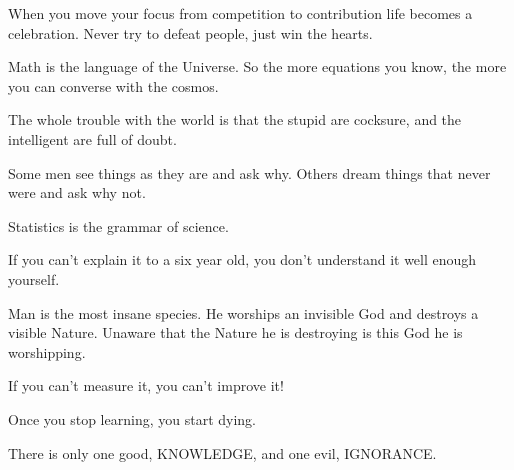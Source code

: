  	\begin{fuquote}[Buddha]When you move your focus from competition to contribution life becomes a celebration. Never try to defeat people, just win the hearts.
 	\end{fuquote}
 	
 	\begin{fuquote}Math is the language of the Universe. So the more equations you know, the more you can converse with the cosmos.
 	\end{fuquote}
 	
 	\begin{fuquote}The whole trouble with the world is that the stupid are cocksure, and the intelligent are full of doubt.
 	\end{fuquote}
 	
 	\begin{fuquote}Some men see things as they are and ask why. Others dream things that never were and ask why not.
 	\end{fuquote}
 	
 	\begin{fuquote}Statistics is the grammar of science.
 	\end{fuquote}
 	
 	\begin{fuquote}If you can't explain it to a six year old, you don't understand it well enough yourself.
 	\end{fuquote}
 	
 	\begin{fuquote}Man is the most insane species. He worships an invisible God and destroys a visible Nature. Unaware that the Nature he is destroying is this God he is worshipping.
 	\end{fuquote}
 	
 	\begin{fuquote}If you can't measure it, you can't improve it!
 	\end{fuquote}
 	
 	\begin{fuquote}Once you stop learning, you start dying.
 	\end{fuquote}
 	
 	\begin{fuquote}[Socrates]There is only one good, KNOWLEDGE, and one evil, IGNORANCE.
 	\end{fuquote}
 	
